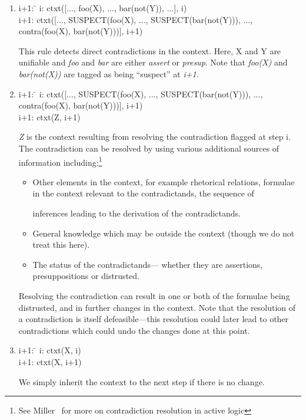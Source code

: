 \documentclass{article}
\begin{document}
\begin{enumerate}
\item
\label{contraDetectionRule}
\begin{tabbing}
i+1: \= \kill
i:\> ctxt([$...$, foo(X), $...$, bar(not(Y)), $...$], i)\\
i+1: \> ctxt([$...$, SUSPECT(foo(X), $...$, SUSPECT(bar(not(Y))), $...$, 
contra(foo(X), bar(not(Y)))], i+1)
\end{tabbing}
This rule detects direct contradictions in the context.
Here, X and Y are unifiable and \emph{foo} and \emph{bar} are either 
\emph{assert} or \emph{presup}. Note that \emph{foo(X)} and \emph{bar(not(X))}
are tagged as being ``suspect'' at \emph{i+1}. 

\item
\label{contraResolutionRule}
\begin{tabbing}
i+1: \= \kill
i: \> ctxt([$...$, SUSPECT(foo(X), $...$, SUSPECT(bar(not(Y))), $...$,  
contra(foo(X), bar(not(Y)))], i+1) \\
i+1:\> ctxt(Z, i+1)
\end{tabbing}
\emph{Z} is the context resulting from resolving the contradiction flagged
at step i. The contradiction can be resolved by using various additional 
sources of information including:\footnote{See
Miller~\cite{miller:reasoning} for more on contradiction resolution in
active logic}
\begin{itemize}

\item
Other elements in the context, for example rhetorical relations,
formulae in the context relevant to the contradictands, the sequence of

inferences leading to the derivation of the contradictands.

\item
General knowledge which may be outside the context
(though we do not treat this here).

\item
The status of the contradictands--- whether they are assertions, 
presuppositions or distrusted.
\end{itemize}

Resolving the contradiction can result in one or both of the formulae being 
distrusted, and in further changes in the context. Note that the resolution
of a contradiction is itself defeasible---this resolution could later
lead to other contradictions which could undo the changes done at this point.

\item
\begin{tabbing}
i+1: \= \kill
i:\> ctxt(X, i)\\
i+1: \> ctxt(X, i+1)
\end{tabbing}
We simply inherit the context to the next step if there is no change.


\end{enumerate}
\end{document}
